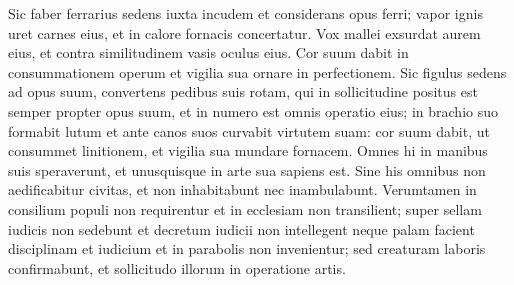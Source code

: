 \begin{biblechapter}
\verse Sic faber ferrarius sedens iuxta incudem et considerans opus ferri; vapor ignis uret carnes eius, et in calore fornacis concertatur. 
\verse Vox mallei exsurdat aurem eius, et contra similitudinem vasis oculus eius. 
\verse Cor suum dabit in consummationem operum et vigilia sua ornare in perfectionem. 
\verse Sic figulus sedens ad opus suum, convertens pedibus suis rotam, qui in sollicitudine positus est semper propter opus suum, et in numero est omnis operatio eius; 
\verse in brachio suo formabit lutum et ante canos suos curvabit virtutem suam: 
\verse cor suum dabit, ut consummet linitionem, et vigilia sua mundare fornacem. 
\verse Omnes hi in manibus suis speraverunt, et unusquisque in arte sua sapiens est. 
\verse Sine his omnibus non aedificabitur civitas, 
\verse et non inhabitabunt nec inambulabunt. Verumtamen in consilium populi non requirentur et in ecclesiam non transilient; 
\verse super sellam iudicis non sedebunt et decretum iudicii non intellegent neque palam facient disciplinam et iudicium et in parabolis non invenientur; 
\verse sed creaturam laboris confirmabunt, et sollicitudo illorum in operatione artis. 
\end{biblechapter}

